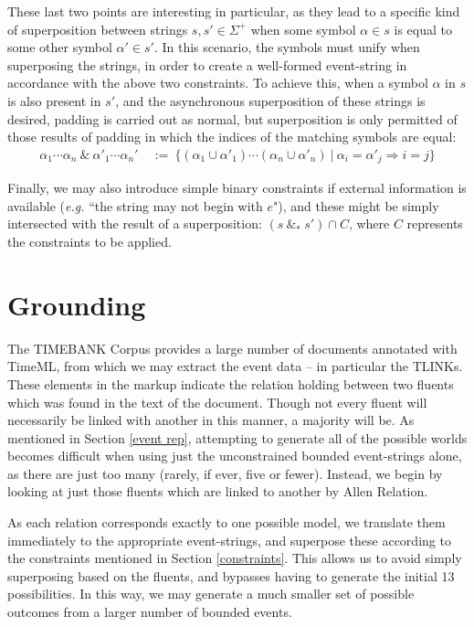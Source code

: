 \documentclass[a4paper,11pt]{article}
\begin{document}
These last two points are interesting in particular, as they lead to a specific 
kind of superposition between strings $s, s' \in \Sigma^+$ when some 
symbol $\alpha \in s$ is equal to some other symbol $\alpha' \in s'$. In this 
scenario, the symbols must unify when superposing the strings, in order to 
create a well-formed event-string in accordance with the above two constraints. 
To achieve this, when a symbol $\alpha$ in $s$ is also present in $s'$, and the 
asynchronous superposition of these strings is desired, padding is carried out 
as normal, but superposition is only permitted of those results of padding 
in which the indices of the matching symbols are equal:
\begin{align*}
\alpha_1\cdots\alpha_n \ \&\ 
\alpha'_1\cdots\alpha_n' & \ :=\
\{(\alpha_1\cup\alpha'_1)\cdots(\alpha_n\cup\alpha'_n) ~|~ \alpha_i = \alpha'_j 
\Rightarrow i = j\}
\end{align*}

Finally, we may also introduce simple binary constraints if external 
information is 
available (\textit{e.g.} ``the string may not begin with $e$"), and these might 
be 
simply intersected with the result of a superposition: $(s\ \&_* \ s') \cap 
C$, where $C$ represents the constraints to be applied.

\section{Grounding}\label{ground}
The TIMEBANK Corpus \citep{pustejovsky2003timebank} provides a large number of 
documents annotated with TimeML, from which we may extract the event data -- in 
particular the TLINKs. These elements in the markup indicate the relation 
holding between two fluents which was found in the text of the document. Though 
not every fluent will necessarily be linked with another in this manner, a 
majority will be.  As mentioned in Section \ref{event rep}, attempting to 
generate all of the possible worlds becomes difficult when using just the 
unconstrained bounded event-strings alone, as there are just too many (rarely, 
if ever, five or fewer). Instead, we begin by looking at just those fluents 
which are linked to another by Allen Relation.

As each relation corresponds exactly to one possible model, we translate them 
immediately to the appropriate event-strings, and superpose these according to 
the constraints mentioned in Section \ref{constraints}. This allows us to avoid 
simply superposing based on the fluents, and bypasses having to generate the 
initial 13 possibilities. In this way, we may generate a much smaller set of 
possible outcomes from a larger number of bounded events.
\end{document}
